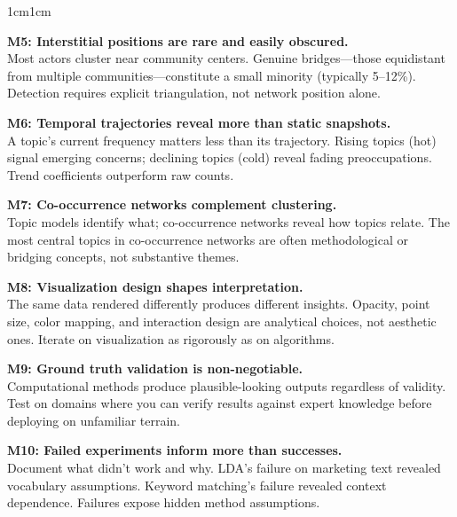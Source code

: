\documentclass[../main.tex]{subfiles}
\begin{document}
\begin{adjustwidth}{1cm}{1cm}
\begin{propositionbox}
\textbf{M5: Interstitial positions are rare and easily obscured.}\\[2pt]
Most actors cluster near community centers. Genuine bridges---those equidistant from multiple communities---constitute a small minority (typically 5--12\%). Detection requires explicit triangulation, not network position alone.
\end{propositionbox}

\begin{propositionbox}
\textbf{M6: Temporal trajectories reveal more than static snapshots.}\\[2pt]
A topic's current frequency matters less than its trajectory. Rising topics (hot) signal emerging concerns; declining topics (cold) reveal fading preoccupations. Trend coefficients outperform raw counts.
\end{propositionbox}

\begin{propositionbox}
\textbf{M7: Co-occurrence networks complement clustering.}\\[2pt]
Topic models identify what; co-occurrence networks reveal how topics relate. The most central topics in co-occurrence networks are often methodological or bridging concepts, not substantive themes.
\end{propositionbox}

\begin{propositionbox}
\textbf{M8: Visualization design shapes interpretation.}\\[2pt]
The same data rendered differently produces different insights. Opacity, point size, color mapping, and interaction design are analytical choices, not aesthetic ones. Iterate on visualization as rigorously as on algorithms.
\end{propositionbox}

\begin{propositionbox}
\textbf{M9: Ground truth validation is non-negotiable.}\\[2pt]
Computational methods produce plausible-looking outputs regardless of validity. Test on domains where you can verify results against expert knowledge before deploying on unfamiliar terrain.
\end{propositionbox}

\begin{propositionbox}
\textbf{M10: Failed experiments inform more than successes.}\\[2pt]
Document what didn't work and why. LDA's failure on marketing text revealed vocabulary assumptions. Keyword matching's failure revealed context dependence. Failures expose hidden method assumptions.
\end{propositionbox}


\end{adjustwidth}
\end{document}
